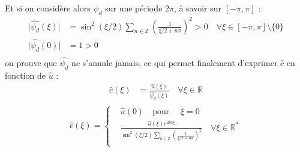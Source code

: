 \documentclass[12pt,a4paper,onecolumn]{article}
\begin{document}
Et si on considère alors \(\widehat{\psi_d}\) sur une période \(2\pi\), à savoir sur \([-\pi, \pi]\) :
\begin{equation*}
	\begin{aligned}
		\lvert\widehat{\psi_d}(\xi)\rvert & = \sin^2(\xi / 2)\sum_{n \in \mathbb{Z}}\left(\frac{1}{\xi / 2 + n\pi}\right)^2 > 0 \quad \forall \xi \in [-\pi, \pi] \setminus \{0\} \\
		\lvert \widehat{\psi_d}(0) \rvert & = 1 > 0                                                                                                                               \\
	\end{aligned}
\end{equation*}
on prouve que \(\widehat{\psi_d}\) ne s'annule jamais, ce qui permet finalement d'exprimer \(\widehat{c}\) en fonction de \(\widehat{u}\) :
\begin{equation*}
	\begin{aligned}
		\widehat{c}(\xi) & = \frac{\widehat{u}(\xi)}{\widehat{\psi_d}(\xi)} \quad \forall \xi \in \mathbb{R} \\
	\end{aligned}
\end{equation*}
\begin{equation*}
	\widehat{c}(\xi) =\left\{
	\begin{aligned}
		 & \widehat{u}(0) \quad \text{pour } \quad \xi = 0                                                                                                          \\
		 & \frac{\widehat{u}(\xi)e^{2i\alpha\xi}}{\sin^2(\xi / 2)\sum_{n \in \mathbb{Z}}\left(\frac{1}{\xi / 2 + n\pi}\right)^2} \quad \forall \xi \in \mathbb{R^*} \\
	\end{aligned}
	\right.
\end{equation*}

\subsection{}
\end{document}
